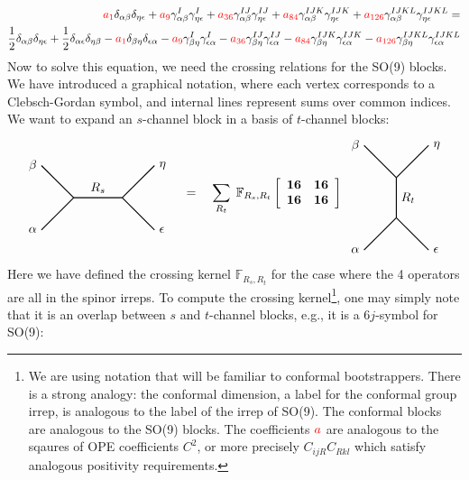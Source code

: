 \documentclass[11pt]{article}
\def\la{\label}
\def\red{\color{red}}
\begin{document}
\begin{align} \la{cyclicity4f}
    {\red a_1} \delta_{\alpha \beta} \delta_{\eta \epsilon}+{\red a_9} \gamma_{\alpha \beta}^I \gamma_{\eta \epsilon}^I+ {\red a_{36}} \gamma_{\alpha \beta}^{I J} \gamma_{\eta \epsilon}^{I J}+ {\red a_{84}} \gamma_{\alpha \beta}^{I J K} \gamma_{\eta\epsilon}^{I J K}+{\red a_{126}} \gamma_{\alpha \beta}^{I J K L} \gamma_{\eta\epsilon}^{I J K L} = \\
    \frac{1}{2} \delta_{\alpha\beta}\delta_{\eta\epsilon}+\frac{1}{2}\delta_{\alpha\epsilon}\delta_{\eta\beta}  - {\red a_1} \delta_{ \beta \eta} \delta_{\epsilon \alpha}-{\red a_9} \gamma_{ \beta \eta}^I \gamma_{\epsilon \alpha}^I- {\red a_{36}} \gamma_{ \beta \eta}^{I J} \gamma_{\epsilon \alpha}^{I J}-{\red a_{84}} \gamma_{ \beta \eta}^{I J K} \gamma_{\epsilon \alpha}^{I J K}- {\red a_{126}} \gamma_{ \beta \eta}^{I J K L} \gamma_{\epsilon \alpha}^{I J K L} 
\end{align}
Now to solve this equation, we need the crossing relations for the SO(9) blocks. We have introduced a graphical notation, where each vertex corresponds to a Clebsch-Gordan symbol, and internal lines represent sums over common indices. We want to expand an $s$-channel block in a basis of $t$-channel blocks:
\begin{align}
\begin{tikzpicture}[baseline={(current bounding box.center)},scale=0.9]
\draw[thick] (-1,1) node[left] {$\beta$} -- (0,0);
\draw[thick] (-1,-1) node[left] {$\alpha$} -- (0,0);
\draw[thick] (0,0) -- (1.5,0) node[midway, above] {$R_s$};
\draw[thick] (1.5,0) -- (2.5,1) node[right] {$\eta$};
\draw[thick] (1.5,0) -- (2.5,-1) node[right] {$\epsilon$};
\end{tikzpicture}
\quad = \quad \sum_{R_t} \; \mathbb{F}_{R_s,R_t}\left[\begin{array}{ll}
{\bf 16} & {\bf 16} \\
{\bf 16} & {\bf 16}
\end{array}\right]  \;
\begin{tikzpicture}[baseline={(current bounding box.center)},scale=0.9]
\draw[thick] (-1,1) node[left] {$\beta$} -- (0,0);
\draw[thick] (0,0) -- (1,1) node[right] {$\eta$};
\draw[thick] (0,0) -- (0,-1.25) node[midway, right] {$R_t$};
\draw[thick] (-1,-2.25) node[left] {$\alpha$} -- (0,-1.25);
\draw[thick] (0,-1.25) -- (1,-2.25) node[right] {$\epsilon$};
\end{tikzpicture}
\la{defCrossing}
\end{align}
Here we have defined the crossing kernel $\mathbb{F}_{R_s,R_t}$ for the case where the 4 operators are all in the spinor irreps. To compute the crossing kernel\footnote{We are using notation that will be familiar to conformal bootstrappers. There is a strong analogy: the conformal dimension, a label for the conformal group irrep, is analogous to the label of the irrep of SO(9). The conformal blocks are analogous to the SO(9) blocks. The coefficients $\red a$ are analogous to the sqaures of OPE coefficients $C^2$, or more precisely $C_{ijR} C_{Rkl}$ which satisfy analogous positivity requirements.}, one may simply note that it is an overlap between $s$ and $t$-channel blocks, e.g., it is a 6$j$-symbol for SO(9):
\end{document}
